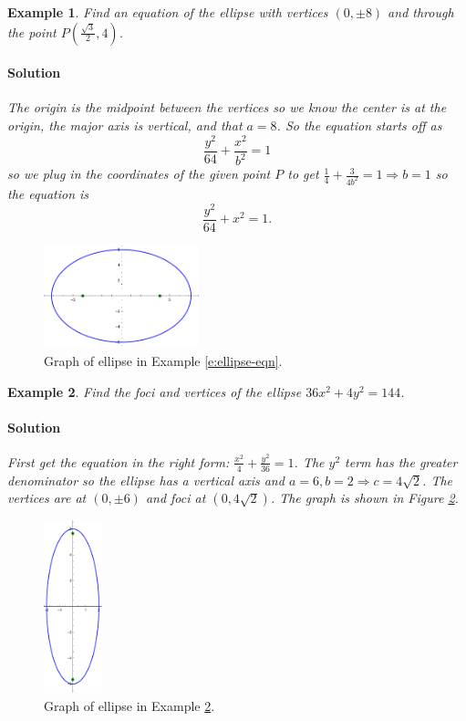 \documentclass[letterpaper, 11pt, openany]{book}
\theoremstyle{mytheoremstyle}
\theoremstyle{myexamplestyle}
\newtheorem{example}{Example}[section]
\newenvironment{solution}{\paragraph{\sffamily \smaller \fontseries{b}\selectfont Solution}}{\hfill\faSquare}
\begin{document}
\begin{example}
    Find an equation of the ellipse with vertices $(0, \pm 8)$ and through the point $P\left( \frac{\sqrt{3}}{2}, 4 \right)$.
    \begin{solution}
        The origin is the midpoint between the vertices so we know the center is at the origin, the major axis is vertical, and that $a = 8$. So the equation starts off as
        \[\frac{y^{2}}{64} + \frac{x^{2}}{b^{2}}  = 1\]
        so we plug in the coordinates of the given point $P$ to get $\displaystyle \frac{1}{4} + \frac{3}{4b^{2}} = 1 \Rightarrow b = 1$ so the equation is
        \[\frac{y^{2}}{64} + x^{2}  = 1.\]
    \end{solution}
\end{example}

\begin{figure}[htbp]
    \centering
        \includegraphics[width=0.4\textwidth]{Figures/ellipseeqn.pdf}
    \caption{Graph of ellipse in Example \ref{e:ellipse-eqn}.}
    \label{f:ellipse-eqn}
\end{figure}

\begin{example}\label{e:ellipseinfo}
    Find the foci and vertices of the ellipse $36x^{2} + 4y^{2} = 144$.
    \begin{solution}
        First get the equation in the right form: $\displaystyle \frac{x^{2}}{4} + \frac{y^{2}}{36} = 1$. The $y^{2}$ term has the greater denominator so the ellipse has a vertical axis and $a = 6, b = 2 \Rightarrow c = 4\sqrt{2}$. The vertices are at $(0, \pm 6)$ and foci at $(0, 4\sqrt{2})$. The graph is shown in Figure \ref{f:ellipseinfo}.
    \end{solution}
\end{example}

\begin{figure}[htbp]
    \centering
        \includegraphics[width=0.15\textwidth]{Figures/ellipseinfo.pdf}
    \caption{Graph of ellipse in Example \ref{e:ellipseinfo}.}
    \label{f:ellipseinfo}
\end{figure}
\end{document}
